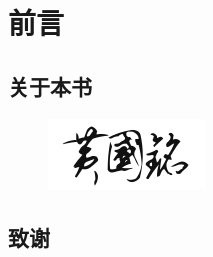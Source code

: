 \chapter{前言}

\section*{关于本书}

\begin{figure}[H]
    \centering
    \includegraphics[scale=0.5]{figures/autograph.png}
\end{figure}

\section*{致谢}
